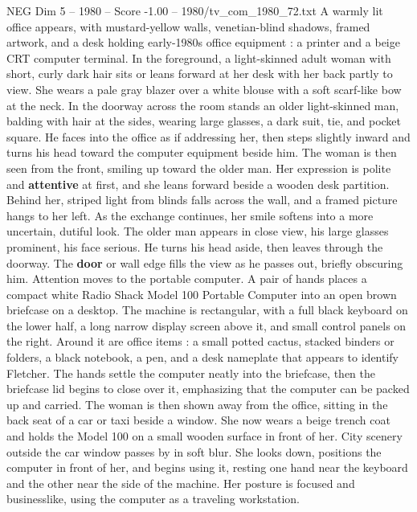 \begin{textsample}{NEG Dim 5 – 1980 – Score -1.00 – 1980/tv\_com\_1980\_72.txt}  \label{ex:f5_neg_068}
A warmly lit office appears, with mustard-yellow walls, venetian-blind shadows, framed artwork, and a desk holding early-1980s office equipment : a printer and a beige CRT computer terminal.
In the foreground, a light-skinned adult woman with short, curly dark hair sits or leans forward at her desk with her back partly to view.
She wears a pale gray blazer over a white blouse with a soft scarf-like bow at the neck.
In the doorway across the room stands an older light-skinned man, balding with hair at the sides, wearing large glasses, a dark suit, tie, and pocket square.
He faces into the office as if addressing her, then steps slightly inward and turns his head toward the computer equipment beside him.
The woman is then seen from the front, smiling up toward the older man.
Her expression is polite and \textbf{attentive} at first, and she leans forward beside a wooden desk partition.
Behind her, striped light from blinds falls across the wall, and a framed picture hangs to her left.
As the exchange continues, her smile softens into a more uncertain, dutiful look.
The older man appears in close view, his large glasses prominent, his face serious.
He turns his head aside, then leaves through the doorway.
The \textbf{door} or wall edge fills the view as he passes out, briefly obscuring him.
Attention moves to the portable computer.
A pair of hands places a compact white Radio Shack Model 100 Portable Computer into an open brown briefcase on a desktop.
The machine is rectangular, with a full black keyboard on the lower half, a long narrow display screen above it, and small control panels on the right.
Around it are office items : a small potted cactus, stacked binders or folders, a black notebook, a pen, and a desk nameplate that appears to identify Fletcher.
The hands settle the computer neatly into the briefcase, then the briefcase lid begins to close over it, emphasizing that the computer can be packed up and carried.
The woman is then shown away from the office, sitting in the back seat of a car or taxi beside a window.
She now wears a beige trench coat and holds the Model 100 on a small wooden surface in front of her.
City scenery outside the car window passes by in soft blur.
She looks down, positions the computer in front of her, and begins using it, resting one hand near the keyboard and the other near the side of the machine.
Her posture is focused and businesslike, using the computer as a traveling workstation.

\end{textsample}
